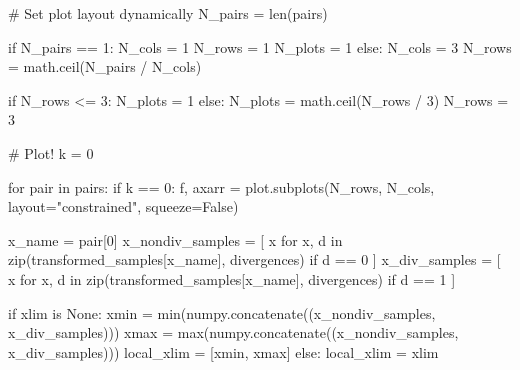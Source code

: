 \documentclass[
  letterpaper,
  DIV=11,
  numbers=noendperiod]{scrartcl}
\newenvironment{Shaded}{\begin{snugshade}}{\end{snugshade}}
\newcommand{\BuiltInTok}[1]{\textcolor[rgb]{0.00,0.23,0.31}{#1}}
\newcommand{\CommentTok}[1]{\textcolor[rgb]{0.37,0.37,0.37}{#1}}
\newcommand{\ControlFlowTok}[1]{\textcolor[rgb]{0.00,0.23,0.31}{#1}}
\newcommand{\DecValTok}[1]{\textcolor[rgb]{0.68,0.00,0.00}{#1}}
\newcommand{\KeywordTok}[1]{\textcolor[rgb]{0.00,0.23,0.31}{#1}}
\newcommand{\NormalTok}[1]{\textcolor[rgb]{0.00,0.23,0.31}{#1}}
\newcommand{\OperatorTok}[1]{\textcolor[rgb]{0.37,0.37,0.37}{#1}}
\newcommand{\StringTok}[1]{\textcolor[rgb]{0.13,0.47,0.30}{#1}}
\newcommand{\VariableTok}[1]{\textcolor[rgb]{0.07,0.07,0.07}{#1}}
\begin{document}
\begin{Shaded}
\begin{Highlighting}[]
  \CommentTok{\# Set plot layout dynamically}
\NormalTok{  N\_pairs }\OperatorTok{=} \BuiltInTok{len}\NormalTok{(pairs)}
  
  \ControlFlowTok{if}\NormalTok{ N\_pairs }\OperatorTok{==} \DecValTok{1}\NormalTok{:}
\NormalTok{    N\_cols }\OperatorTok{=} \DecValTok{1}
\NormalTok{    N\_rows }\OperatorTok{=} \DecValTok{1}
\NormalTok{    N\_plots }\OperatorTok{=} \DecValTok{1}
  \ControlFlowTok{else}\NormalTok{:}
\NormalTok{    N\_cols }\OperatorTok{=} \DecValTok{3}
\NormalTok{    N\_rows }\OperatorTok{=}\NormalTok{ math.ceil(N\_pairs }\OperatorTok{/}\NormalTok{ N\_cols)}
    
  \ControlFlowTok{if}\NormalTok{ N\_rows }\OperatorTok{\textless{}=} \DecValTok{3}\NormalTok{:}
\NormalTok{    N\_plots }\OperatorTok{=} \DecValTok{1}
  \ControlFlowTok{else}\NormalTok{:}
\NormalTok{    N\_plots }\OperatorTok{=}\NormalTok{ math.ceil(N\_rows }\OperatorTok{/} \DecValTok{3}\NormalTok{)}
\NormalTok{    N\_rows }\OperatorTok{=} \DecValTok{3}
    
  \CommentTok{\# Plot!}
\NormalTok{  k }\OperatorTok{=} \DecValTok{0}
  
  \ControlFlowTok{for}\NormalTok{ pair }\KeywordTok{in}\NormalTok{ pairs:}
    \ControlFlowTok{if}\NormalTok{ k }\OperatorTok{==} \DecValTok{0}\NormalTok{:}
\NormalTok{      f, axarr }\OperatorTok{=}\NormalTok{ plot.subplots(N\_rows, N\_cols, layout}\OperatorTok{=}\StringTok{"constrained"}\NormalTok{,}
\NormalTok{                               squeeze}\OperatorTok{=}\VariableTok{False}\NormalTok{)}
      
\NormalTok{    x\_name }\OperatorTok{=}\NormalTok{ pair[}\DecValTok{0}\NormalTok{]}
\NormalTok{    x\_nondiv\_samples }\OperatorTok{=}\NormalTok{ [ x }\ControlFlowTok{for}\NormalTok{ x, d }\KeywordTok{in} 
                         \BuiltInTok{zip}\NormalTok{(transformed\_samples[x\_name], divergences) }
                         \ControlFlowTok{if}\NormalTok{ d }\OperatorTok{==} \DecValTok{0}\NormalTok{  ]}
\NormalTok{    x\_div\_samples    }\OperatorTok{=}\NormalTok{ [ x }\ControlFlowTok{for}\NormalTok{ x, d }\KeywordTok{in} 
                         \BuiltInTok{zip}\NormalTok{(transformed\_samples[x\_name], divergences) }
                         \ControlFlowTok{if}\NormalTok{ d }\OperatorTok{==} \DecValTok{1}\NormalTok{  ]}
    
    \ControlFlowTok{if}\NormalTok{ xlim }\KeywordTok{is} \VariableTok{None}\NormalTok{:}
\NormalTok{      xmin }\OperatorTok{=} \BuiltInTok{min}\NormalTok{(numpy.concatenate((x\_nondiv\_samples, x\_div\_samples)))}
\NormalTok{      xmax }\OperatorTok{=} \BuiltInTok{max}\NormalTok{(numpy.concatenate((x\_nondiv\_samples, x\_div\_samples)))}
\NormalTok{      local\_xlim }\OperatorTok{=}\NormalTok{ [xmin, xmax]}
    \ControlFlowTok{else}\NormalTok{:}
\NormalTok{      local\_xlim }\OperatorTok{=}\NormalTok{ xlim}
    

\end{Highlighting}
\end{Shaded}
\end{document}
